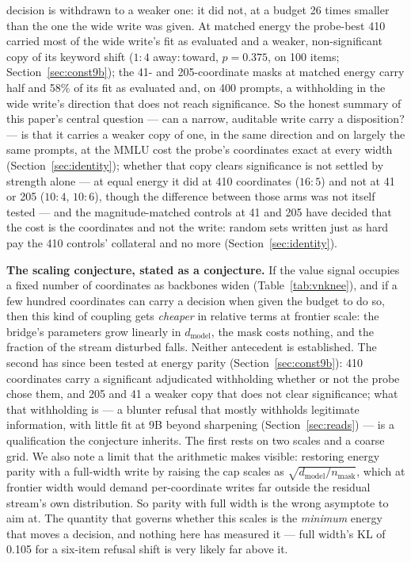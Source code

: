 \documentclass[11pt]{article}
\begin{document}
decision is withdrawn to a weaker one: it did not, at a budget 26 times smaller
than the one the wide write was given. At matched energy the probe-best 410
carried most of the wide write's fit as evaluated and a weaker, non-significant copy of its
keyword shift ($1{:}4$ away${:}$toward, $p = 0.375$, on 100 items;
Section~\ref{sec:const9b}); the 41- and 205-coordinate masks at matched energy
carry half and 58\% of its fit as evaluated and, on 400 prompts, a withholding in the wide
write's direction that does not reach significance. So the honest summary of this
paper's central question --- can a narrow, auditable write carry a disposition? ---
is that it carries a weaker copy of one, in the same direction and on largely the
same prompts, at the MMLU cost the probe's coordinates exact at every width
(Section~\ref{sec:identity}); whether that copy clears significance is not settled
by strength alone --- at equal energy it did at 410 coordinates ($16{:}5$) and not at
41 or 205 ($10{:}4$, $10{:}6$), though the difference between those arms was not
itself tested --- and the magnitude-matched controls at 41 and
205 have decided that the cost is the coordinates and not the write: random sets
written just as hard pay the 410 controls' collateral and no more
(Section~\ref{sec:identity}).

\textbf{The scaling conjecture, stated as a conjecture.} If the value signal
occupies a fixed number of coordinates as backbones widen (Table~\ref{tab:vnknee}),
and if a few hundred coordinates can carry a decision when given the budget to do
so, then this kind of coupling gets \emph{cheaper} in relative terms at frontier
scale: the bridge's parameters grow linearly in $d_{\mathrm{model}}$, the mask costs
nothing, and the fraction of the stream disturbed falls. Neither antecedent is
established. The second has since been tested at energy parity
(Section~\ref{sec:const9b}): 410 coordinates carry a significant adjudicated
withholding whether or not the probe chose them, and 205 and 41 a weaker copy that
does not clear significance; what that withholding is --- a blunter refusal that
mostly withholds legitimate information, with little fit at 9B beyond sharpening
(Section~\ref{sec:reads}) --- is a qualification the conjecture inherits. The first
rests on two scales and a coarse grid. We also note a limit that the arithmetic makes
visible: restoring energy parity with a full-width write by raising the cap scales
as $\sqrt{d_{\mathrm{model}}/n_{\mathrm{mask}}}$, which at frontier width would
demand per-coordinate writes far outside the residual stream's own distribution. So
parity with full width is the wrong asymptote to aim at. The quantity that governs
whether this scales is the \emph{minimum} energy that moves a decision, and nothing
here has measured it --- full width's KL of 0.105 for a six-item refusal shift is
very likely far above it.
\end{document}

